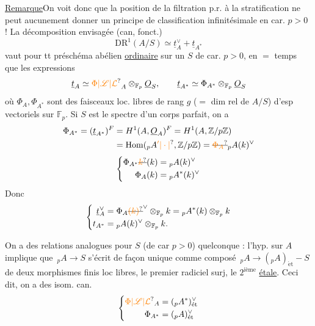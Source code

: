 \uline{Remarque}\quad On voit donc que la position de
la filtration p.r. à la stratification ne peut aucunement
donner un principe de classification  infinitésimale en car. $p>0$ !
La décomposition envisagée (can, fonct.)
\[
\mathrm{DR}^1(A/S)\simeq\underline{t}_A^\vee+\underline{t}_{A^*}
\]
vaut pour tt préschéma abélien \uline{ordinaire} sur
un $S$ de car. $p>0$, en $=$ temps que les expressions
\[
\underline{t}_A\simeq\unsure{\Phi|\mathscr L|\mathcal L}_A\otimes_{\mathbb F_p}\underline O_S,\qquad
\underline{t}_{A^*}\simeq\Phi_{A^*}\otimes_{\mathbb F_p}\underline O_S
\]
où $\Phi_A,\Phi_{A^*}$ sont des faisceaux  loc. 
libres de rang $g$ ($=$ dim rel de $A/S$) d'esp vectoriels
sur $\mathbb F_p$. Si $S$ est le spectre d'un corps parfait,
on a
\[
\begin{aligned}
\Phi_{A^*}=(\underline t_{A^*})^F&=H^1(A,\underline O_A)^F=H^1(A,\mathbb Z/p\mathbb Z)\\
&=\operatorname{Hom}({}_pA\unsure{'|\cdot|{}},\mathbb Z/p\mathbb Z)=\deleted{\unsure{\Phi_A}}{}_pA(k)^\vee
\end{aligned}
\]
\[
\left\{\begin{aligned}
\Phi_{A^*}\deleted{\unsure{k}}(k)&={}_pA(k)^\vee\\
\Phi_A(k)&={}_pA^*(k)^\vee
\end{aligned}\right.
\]
Donc
\[
\left\{\begin{aligned}
\underline t_A^\vee&=\Phi_A\deleted{\unsure{(k)}}^\vee\otimes_{\mathbb F_p}k={}_p A^*(k)\otimes_{\mathbb F_p}k\\
t_{A^*}&={}_pA(k)^\vee\otimes_{\mathbb F_p}k .
\end{aligned}\right.
\]

On a des relations analogues pour $S$ (de car $p>0$)
quelconque : l'hyp. sur $A$ implique que
$\,{}_pA\mathbin{\to}S$ s'écrit de façon unique comme
composé $\,{}_pA\longrightarrow({}_pA)_{\mathrm{\acute et}}\mathbin{-}S$ de deux morphismes
finis loc libres, le premier radiciel surj, le $2^{\mathrm{ième}}$ \uline{étale}.
Ceci dit, on a des isom. can.
\[
\left\{\begin{aligned}
\unsure{\Phi|\mathscr L|\mathcal L}_A&=({}_pA^*)_{\mathrm{\acute et}}^\vee\\
\Phi_{A^*}&=({}_pA)_{\mathrm{\acute et}}^\vee
\end{aligned}\right.
\]

